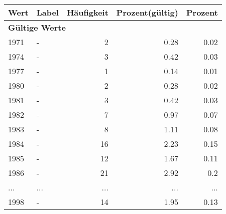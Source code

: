      \begin{longtable}{lXrrr}
     \toprule
     \textbf{Wert} & \textbf{Label} & \textbf{Häufigkeit} & \textbf{Prozent(gültig)} & \textbf{Prozent} \\
     \endhead
     \midrule
     \multicolumn{5}{l}{\textbf{Gültige Werte}}\\
        1971 & \multicolumn{1}{X}{-} & %
          \num{2} &
          \num[round-mode=places,round-precision=2]{0.28} &
          \num[round-mode=places,round-precision=2]{0.02} \\
        1974 & \multicolumn{1}{X}{-} & %
          \num{3} &
          \num[round-mode=places,round-precision=2]{0.42} &
          \num[round-mode=places,round-precision=2]{0.03} \\
        1977 & \multicolumn{1}{X}{-} & %
          \num{1} &
          \num[round-mode=places,round-precision=2]{0.14} &
          \num[round-mode=places,round-precision=2]{0.01} \\
        1980 & \multicolumn{1}{X}{-} & %
          \num{2} &
          \num[round-mode=places,round-precision=2]{0.28} &
          \num[round-mode=places,round-precision=2]{0.02} \\
        1981 & \multicolumn{1}{X}{-} & %
          \num{3} &
          \num[round-mode=places,round-precision=2]{0.42} &
          \num[round-mode=places,round-precision=2]{0.03} \\
        1982 & \multicolumn{1}{X}{-} & %
          \num{7} &
          \num[round-mode=places,round-precision=2]{0.97} &
          \num[round-mode=places,round-precision=2]{0.07} \\
        1983 & \multicolumn{1}{X}{-} & %
          \num{8} &
          \num[round-mode=places,round-precision=2]{1.11} &
          \num[round-mode=places,round-precision=2]{0.08} \\
        1984 & \multicolumn{1}{X}{-} & %
          \num{16} &
          \num[round-mode=places,round-precision=2]{2.23} &
          \num[round-mode=places,round-precision=2]{0.15} \\
        1985 & \multicolumn{1}{X}{-} & %
          \num{12} &
          \num[round-mode=places,round-precision=2]{1.67} &
          \num[round-mode=places,round-precision=2]{0.11} \\
        1986 & \multicolumn{1}{X}{-} & %
          \num{21} &
          \num[round-mode=places,round-precision=2]{2.92} &
          \num[round-mode=places,round-precision=2]{0.2} \\
       ... & ... & ... & ... & ... \\
        1998 & \multicolumn{1}{X}{-} & %
          \num{14} &
          \num[round-mode=places,round-precision=2]{1.95} &
          \num[round-mode=places,round-precision=2]{0.13} \\


\end{longtable}
